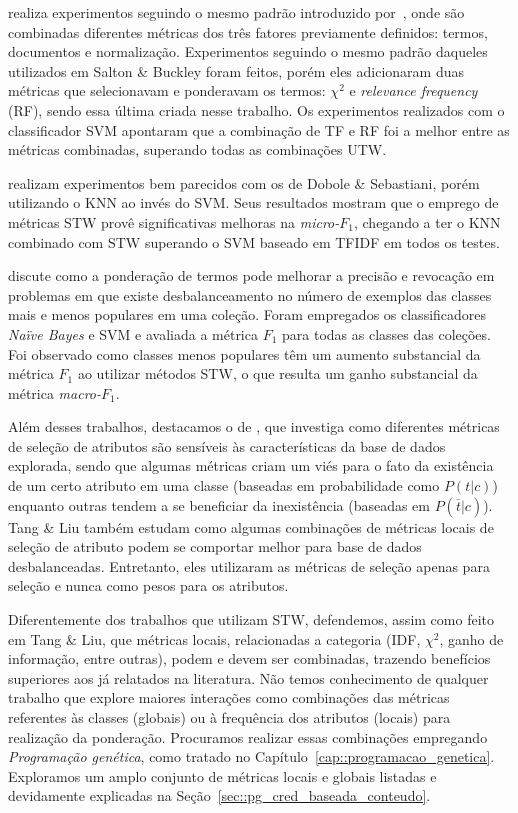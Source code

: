 \cite{Lan05} realiza experimentos seguindo o mesmo padrão introduzido por~\cite{Salton88}, onde são combinadas diferentes métricas dos três fatores previamente definidos: termos, documentos e normalização. Experimentos seguindo o mesmo padrão daqueles utilizados em Salton \& Buckley foram feitos, porém eles adicionaram duas métricas que selecionavam e ponderavam os termos: $\chi^2$ e \textit{relevance frequency} (\textsc{RF}), sendo essa última criada nesse trabalho. Os experimentos realizados com o classificador \textsc{SVM} apontaram que a combinação de \textsc{TF} e \textsc{RF} foi a melhor entre as métricas combinadas, superando todas as combinações \textsc{UTW}. 

\cite{Batal09} realizam experimentos bem parecidos com os de Dobole \& Sebastiani, porém utilizando o \textsc{KNN} ao invés do \textsc{SVM}. Seus resultados mostram que o emprego de métricas \textsc{STW} provê significativas melhoras na \textit{micro-$F_1$}, chegando a ter o \textsc{KNN} combinado com \textsc{STW} superando o \textsc{SVM} baseado em \textsc{TFIDF} em todos os testes.

\cite{Liu09}
discute como a ponderação de termos pode melhorar a precisão e revocação em problemas em que existe desbalanceamento no número de exemplos das classes mais e menos populares em uma coleção. Foram empregados os classificadores \textit{Naïve Bayes} e \textsc{SVM} e avaliada a métrica $F_1$ para todas as classes das coleções. Foi observado como classes menos populares têm um aumento substancial da métrica $F_1$ ao utilizar métodos \textsc{STW}, o que resulta um ganho substancial da métrica \textit{macro-$F_1$}.

Além desses trabalhos, destacamos o de \cite{Tang05}, que investiga como diferentes métricas de seleção de atributos são sensíveis às características da base de dados explorada, sendo que algumas métricas criam um viés para o fato da existência de um certo atributo em uma classe (baseadas em probabilidade como $P(t|c)$) enquanto outras tendem a se beneficiar da inexistência (baseadas em $P(\overline{t}|c)$). Tang \& Liu também estudam como algumas combinações de métricas locais de seleção de atributo podem se comportar melhor para base de dados desbalanceadas. Entretanto, eles utilizaram as métricas de seleção apenas para seleção e nunca como pesos para os atributos.

Diferentemente dos trabalhos que utilizam \textsc{STW}, defendemos, assim como feito em Tang \& Liu, que métricas locais, relacionadas a categoria (\textsc{IDF}, $\chi^2$, ganho de informação, entre outras), podem e devem ser combinadas, trazendo benefícios superiores aos já relatados na literatura. Não temos conhecimento de qualquer trabalho que explore maiores interações como combinações das métricas referentes às classes (globais) ou à frequência dos atributos (locais) para realização da ponderação. Procuramos realizar essas combinações empregando \textit{Programação genética}, como tratado no Capítulo~\ref{cap::programacao_genetica}. Exploramos um amplo conjunto de métricas locais e globais listadas e devidamente explicadas na Seção~\ref{sec::pg_cred_baseada_conteudo}.

